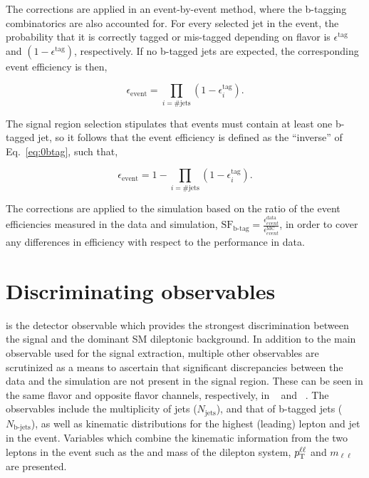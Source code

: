 The corrections are applied in an event-by-event method, where the b-tagging combinatorics are also accounted for. For every selected jet in the event, the probability that it is correctly tagged or mis-tagged depending on flavor is $\epsilon^{\text{tag}}$ and $(1-\epsilon^{\text{tag}})$, respectively. If no b-tagged jets are expected, the corresponding event efficiency is then,

\begin{equation}
  \epsilon_{\text{event}} = \prod_{i=\text{\# jets}} (1-\epsilon^{\text{tag}}_i).
  \label{eq:0btag}
\end{equation}

The signal region selection stipulates that events must contain at least one b-tagged jet, so it follows that the event efficiency is defined as the ``inverse'' of Eq.~\ref{eq:0btag}, such that,

\begin{equation}
  \epsilon_{\text{event}} = 1 - \prod_{i=\text{\# jets}} (1-\epsilon^{\text{tag}}_i).
  \label{eq:more0btag}
\end{equation}

The corrections are applied to the simulation based on the ratio of the event efficiencies measured in the data and simulation, $\text{SF}_\text{b-tag} = \frac{\epsilon_{event}^{\text{data}}}{\epsilon_{event}^{\text{MC}}}$, in order to cover any differences in efficiency with respect to the performance in data.

\section{Discriminating observables}
\label{sec:observables}

\ptmiss is the detector observable which provides the strongest discrimination between the \ttDM signal and the dominant SM dileptonic \ttbar background. In addition to the main observable used for the signal extraction, multiple other observables are scrutinized as a means to ascertain that significant discrepancies between the data and the simulation are not present in the signal region. These can be seen in the same flavor and opposite flavor channels, respectively, in ~ and ~. The observables include the multiplicity of jets ($N_{\textrm{jets}}$), and that of b-tagged jets ($N_{\text{b-jets}}$), as well as kinematic distributions for the highest \pt (leading) lepton and jet in the event. Variables which combine the kinematic information from the two leptons in the event such as the \pt and mass of the dilepton system, $p_{\mathrm{T}}^{\ell\ell}$ and $m_{\ell\ell}$ are presented. %

